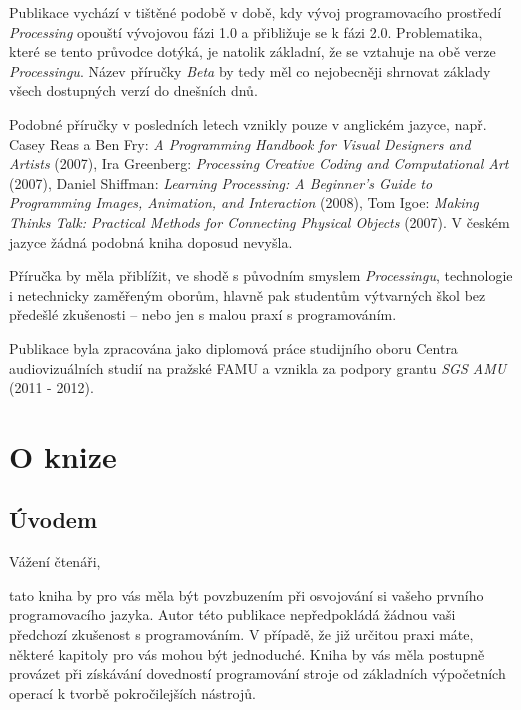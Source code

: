 \documentclass[10pt,twoside=true,open=right,cleardoublepage=empty,chapterprefix=true]{scrbook}
\newcommand{\oddil}[1]{\section{#1}\index{#1}\label{#1}}
\newcommand{\lnb}{\linebreak}
\begin{document}
Publikace vychází v tištěné podobě v době, kdy vývoj programovacího prostředí {\em Processing} opouští vývojovou fázi 1.0 a přibližuje se k fázi 2.0. Problematika, které se tento průvodce dotýká, je natolik základní, že se \lnb vztahuje na obě verze {\em Processingu}. Název příručky {\em Beta} by tedy měl co nejobecněji shrnovat základy všech dostupných verzí do dnešních dnů. 

Podobné příručky v posledních letech vznikly pouze v anglickém jazyce, např. Casey Reas a Ben Fry: {\em A Programming Handbook for Visual Designers and Artists} (2007), Ira Greenberg: {\em Processing Creative Coding and \lnb Computational Art}  (2007), Daniel Shiffman: {\em Learning Processing: A Begin\-ner's Guide to Programming Images, Animation, and Interaction}  (2008), Tom Igoe: {\em Making Thinks Talk: Practical Methods for Connecting Physical Objects} (2007). V českém jazyce žádná podobná kniha doposud nevyšla.

Příručka by měla přiblížit, ve shodě s původním smyslem {\em Processingu}, technologie i netechnicky zaměřeným oborům, hlavně pak studentům výtvarných škol bez předešlé zkušenosti -- nebo jen s malou praxí s programováním.


Publikace byla zpracována jako diplomová práce studijního oboru \lnb Centra audiovizuálních studií na pražské FAMU a vznikla za podpory \lnb grantu {\em SGS AMU} (2011 - 2012). 









\tableofcontents

\pagestyle{empty}

\vfill
\chapter{O knize}



\vfill
\thispagestyle{empty}



\oddil{Úvodem}

\pagestyle{fancyplain}

Vážení čtenáři,

tato kniha by pro vás měla být povzbuzením při osvojování si vašeho prvního programovacího jazyka. Autor této publikace nepředpokládá žádnou vaši předchozí zkušenost s programováním. V případě, že již určitou praxi máte, některé kapitoly pro vás mohou být jednoduché. Kniha by vás měla postupně provázet při získávání dovedností programování stroje od základních výpočetních operací k tvorbě pokročilejších nástrojů.
\end{document}
